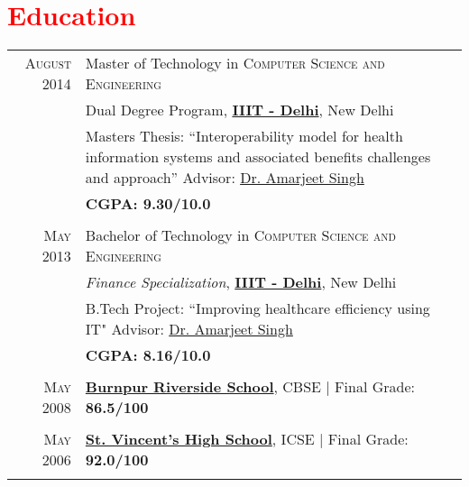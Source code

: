 \documentclass[a4paper,11pt]{article} %
\begin{document}
\section{ \texorpdfstring{\textcolor{red}{Education}}{Education} }
\begin{tabular}{rp{15cm}}	
\textsc{August} 2014 & Master of Technology in \textsc{Computer Science and Engineering}\\
& Dual Degree Program, \href{http://www.iiitd.ac.in}{\textbf{IIIT - Delhi}}, New Delhi\\
& Masters Thesis: ``Interoperability model for health information systems and \newline associated benefits challenges and approach'' \newline \small Advisor: \href{https://www.iiitd.edu.in/~amarjeet/}{Dr. Amarjeet Singh}  \\
&\normalsize \textbf{\textsc{CGPA}: 9.30/10.0}\\
&\\


\textsc{May} 2013& Bachelor of Technology in \textsc{}\textsc{Computer Science and Engineering} \\&
 \emph{Finance Specialization}, \href{http://www.iiitd.ac.in}{\textbf{IIIT - Delhi}}, New Delhi\\
& B.Tech Project: ``Improving healthcare efficiency using IT" \newline \small Advisor: \href{https://www.iiitd.edu.in/~amarjeet/}{Dr. Amarjeet Singh}\\
&\normalsize \textbf{\textsc{CGPA}: 8.16/10.0} \\
&\\


\textsc{May} 2008& \href{http://www.brsschool.org/}{\textbf{Burnpur Riverside School}}, CBSE | Final Grade:\textbf{ 86.5/100}\\
&\\


\textsc{May} 2006& \href{http://svsasansol.com/}{\textbf{St. Vincent's High School}}, ICSE | Final Grade:\textbf{ 92.0/100}\\
&\\
\end{tabular}


\end{document}
